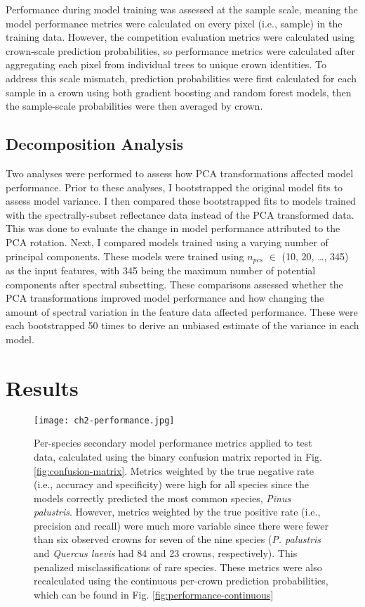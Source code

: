 Performance during model training was assessed at the sample scale, meaning the model performance metrics were calculated on every pixel (i.e., sample) in the training data. However, the competition evaluation metrics were calculated using crown-scale prediction probabilities, so performance metrics were calculated after aggregating each pixel from individual trees to unique crown identities. To address this scale mismatch, prediction probabilities were first calculated for each sample in a crown using both gradient boosting and random forest models, then the sample-scale probabilities were then averaged by crown.

\subsection{Decomposition Analysis}

Two analyses were performed to assess how PCA transformations affected model performance. Prior to these analyses, I bootstrapped the original model fits to assess model variance. I then compared these bootstrapped fits to models trained with the spectrally-subset reflectance data instead of the PCA transformed data. This was done to evaluate the change in model performance attributed to the PCA rotation. Next, I compared models trained using a varying number of principal components. These models were trained using $n_{pcs}$ $\in$ (10, 20, …, 345) as the input features, with 345 being the maximum number of potential components after spectral subsetting. These comparisons assessed whether the PCA transformations improved model performance and how changing the amount of spectral variation in the feature data affected performance. These were each bootstrapped 50 times to derive an unbiased estimate of the variance in each model.

\section{Results}

\begin{figure}[!ht]
\texttt{[image: ch2-performance.jpg]}
\centering
\caption[Per-species secondary model performance metrics applied to test data]{Per-species secondary model performance metrics applied to test data, calculated using the binary confusion matrix reported in Fig. \ref{fig:confusion-matrix}. Metrics weighted by the true negative rate (i.e., accuracy and specificity) were high for all species since the models correctly predicted the most common species, \textit{Pinus palustris}. However, metrics weighted by the true positive rate (i.e., precision and recall) were much more variable since there were fewer than six observed crowns for seven of the nine species (\textit{P. palustris} and \textit{Quercus laevis} had 84 and 23 crowns, respectively). This penalized misclassifications of rare species. These metrics were also recalculated using the continuous per-crown prediction probabilities, which can be found in Fig. \ref{fig:performance-continuous}}
\label{fig:performance}
\end{figure}

